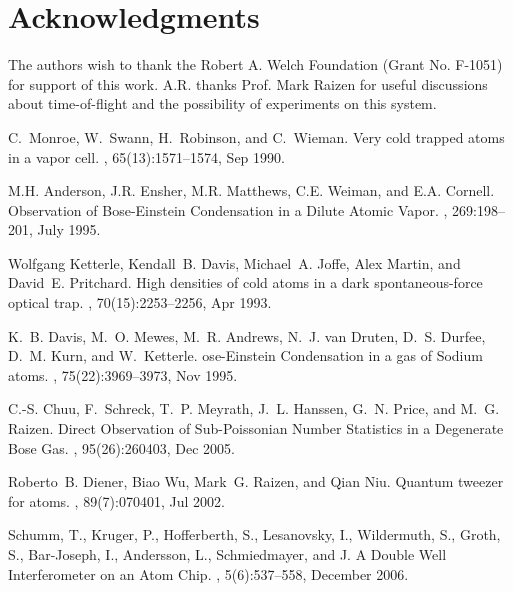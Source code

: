 \documentclass{article}
\begin{document}
\section{Acknowledgments}
%
%
The authors wish to thank the Robert A. Welch Foundation (Grant No. F-1051) for support of this work. A.R. thanks Prof. Mark Raizen for useful discussions about time-of-flight and the possibility of experiments on this system.

\pagebreak





\begin{thebibliography}{10}

C.~Monroe, W.~Swann, H.~Robinson, and C.~Wieman.
\newblock Very cold trapped atoms in a vapor cell.
, 65(13):1571--1574, Sep 1990.

M.H. Anderson, J.R. Ensher, M.R. Matthews, C.E. Weiman, and E.A. Cornell.
\newblock Observation of {B}ose-{E}instein {C}ondensation in a {D}ilute
  {A}tomic {V}apor.
, 269:198--201, July 1995.

Wolfgang Ketterle, Kendall~B. Davis, Michael~A. Joffe, Alex Martin, and
  David~E. Pritchard.
\newblock High densities of cold atoms in a dark spontaneous-force optical
  trap.
, 70(15):2253--2256, Apr 1993.

K.~B. Davis, M.~O. Mewes, M.~R. Andrews, N.~J. {van Druten}, D.~S. Durfee,
  D.~M. Kurn, and W.~Ketterle.
ose-{E}instein {C}ondensation in a gas of {S}odium atoms.
, 75(22):3969--3973, Nov 1995.

C.-S. Chuu, F.~Schreck, T.~P. Meyrath, J.~L. Hanssen, G.~N. Price, and M.~G.
  Raizen.
\newblock Direct {O}bservation of {S}ub-{P}oissonian {N}umber {S}tatistics in a
  {D}egenerate {B}ose {G}as.
, 95(26):260403, Dec 2005.

Roberto~B. Diener, Biao Wu, Mark~G. Raizen, and Qian Niu.
\newblock Quantum tweezer for atoms.
, 89(7):070401, Jul 2002.

Schumm, T., Kruger, P., Hofferberth, S., Lesanovsky, I., Wildermuth, S., Groth,
  S., Bar-Joseph, I., Andersson, L., Schmiedmayer, and J.
\newblock A {D}ouble {W}ell {I}nterferometer on an {A}tom {C}hip.
, 5(6):537--558, December 2006.


\end{thebibliography}
\end{document}
